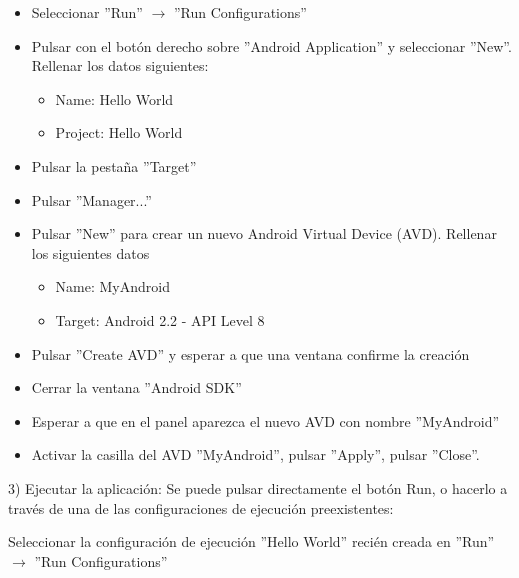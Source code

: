 \documentclass[hyperref={pdfpagelabels=true},utf8x]{beamer}
\begin{document}
\begin{frame}[shrink=55.9]
\begin{itemize}
    \item Seleccionar ''Run'' $\rightarrow$ ''Run Configurations''
    \item Pulsar con el botón derecho sobre ''Android Application'' y seleccionar ''New''. Rellenar los datos siguientes:
      \begin{itemize}
      \item Name: Hello World
      \item Project: Hello World
      \end{itemize}
    \item Pulsar la pestaña ''Target''
    \item Pulsar ''Manager...''
    \item Pulsar ''New'' para crear un nuevo Android Virtual Device (AVD). Rellenar los siguientes datos
      \begin{itemize}
      \item Name: MyAndroid
      \item Target: Android 2.2 - API Level 8
      \end{itemize}
    \item Pulsar ''Create AVD'' y esperar a que una ventana confirme la creación
    \item Cerrar la ventana ''Android SDK''
    \item Esperar a que en el panel aparezca el nuevo AVD con nombre ''MyAndroid''
    \item Activar la casilla del AVD ''MyAndroid'', pulsar ''Apply'', pulsar ''Close''.
\end{itemize}

\begin{block}{3) Ejecutar la aplicación:}
Se puede pulsar directamente el botón Run, o hacerlo a través de una de las configuraciones de ejecución preexistentes:
\end{block}

Seleccionar la configuración de ejecución ''Hello World'' recién creada en ''Run'' $\rightarrow$ ''Run Configurations''


\end{frame}
\end{document}
